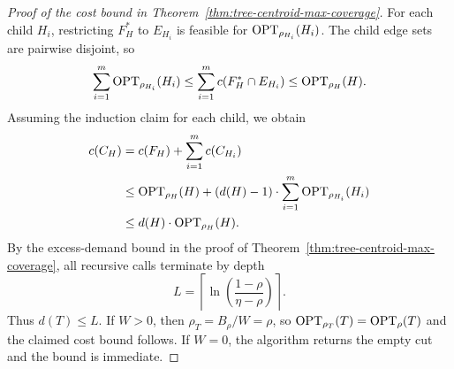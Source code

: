 \begin{proof}[Proof of the cost bound in Theorem~\ref{thm:tree-centroid-max-coverage}]
For each child $H_i$, restricting $F_H^*$ to $E_{H_i}$ is feasible for $\textup{OPT}_{\rho_{H_i}}(H_i)$. The child edge sets are pairwise disjoint, so
\[
    \sum_{i=1}^m\textup{OPT}_{\rho_{H_i}}(H_i)
    \leq\sum_{i=1}^m c(F_H^*\cap E_{H_i})
    \leq\textup{OPT}_{\rho_H}(H).
\]
Assuming the induction claim for each child, we obtain
\begin{align*}
    c(C_H)
    &=c(F_H)+\sum_{i=1}^m c(C_{H_i})\\
    &\leq\textup{OPT}_{\rho_H}(H)+(d(H)-1)\cdot \sum_{i=1}^m\textup{OPT}_{\rho_{H_i}}(H_i)\\
    &\leq d(H)\cdot\textup{OPT}_{\rho_H}(H).
\end{align*}
By the excess-demand bound in the proof of Theorem~\ref{thm:tree-centroid-max-coverage}, all recursive calls terminate by depth
\[
    L=\left\lceil\ln\left(\frac{1-\rho}{\eta-\rho}\right)\right\rceil.
\]
Thus $d(T)\leq L$. If $W>0$, then $\rho_T=B_\rho/W=\rho$, so $\textup{OPT}_{\rho_T}(T)=\textup{OPT}_{\rho}\mathopen{}\left( T \right)$ and the claimed cost bound follows. If $W=0$, the algorithm returns the empty cut and the bound is immediate.
\end{proof}

